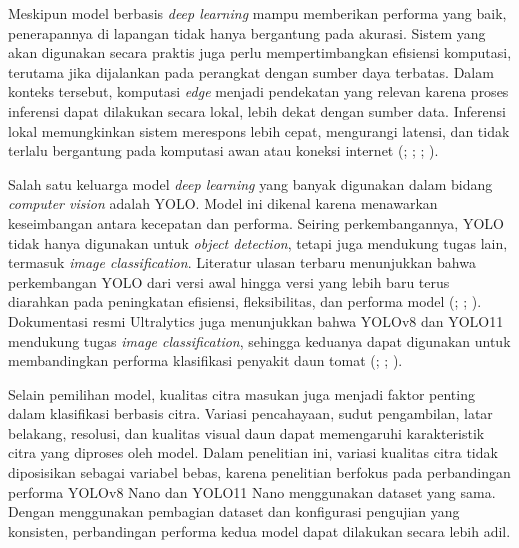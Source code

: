 \begin{sectioncontent}
    Meskipun model berbasis \textit{deep learning} mampu memberikan performa yang baik, penerapannya di lapangan tidak hanya bergantung pada akurasi. Sistem yang akan digunakan secara praktis juga perlu mempertimbangkan efisiensi komputasi, terutama jika dijalankan pada perangkat dengan sumber daya terbatas. Dalam konteks tersebut, komputasi \textit{edge} menjadi pendekatan yang relevan karena proses inferensi dapat dilakukan secara lokal, lebih dekat dengan sumber data. Inferensi lokal memungkinkan sistem merespons lebih cepat, mengurangi latensi, dan tidak terlalu bergantung pada komputasi awan atau koneksi internet (\citealp[hlm. 71--74]{singh2023edge}; \citealp[hlm. 1--4]{gill2025taxonomy}; \citealp[hlm. 1--6]{xu2025edge}; \citealp[hlm. 1, 6--7, dan 10--13]{majeed2024edge}).

    Salah satu keluarga model \textit{deep learning} yang banyak digunakan dalam bidang \textit{computer vision} adalah YOLO. Model ini dikenal karena menawarkan keseimbangan antara kecepatan dan performa. Seiring perkembangannya, YOLO tidak hanya digunakan untuk \textit{object detection}, tetapi juga mendukung tugas lain, termasuk \textit{image classification}. Literatur ulasan terbaru menunjukkan bahwa perkembangan YOLO dari versi awal hingga versi yang lebih baru terus diarahkan pada peningkatan efisiensi, fleksibilitas, dan performa model (\citealp[hlm. 1680--1683]{terven2023yolo}; \citealp[hlm. 1--3]{ali2024yoloframework}; \citealp[hlm. 1--3]{murat2025yolo}). Dokumentasi resmi Ultralytics juga menunjukkan bahwa YOLOv8 dan YOLO11 mendukung tugas \textit{image classification}, sehingga keduanya dapat digunakan untuk membandingkan performa klasifikasi penyakit daun tomat (\citealp[bagian \textit{Image Classification}]{ultralyticsclassify}; \citealp[bagian \textit{YOLOv8 Models}]{ultralyticsyolov8}; \citealp[bagian \textit{YOLO11 Models}]{ultralyticsyolo11}).

    Selain pemilihan model, kualitas citra masukan juga menjadi faktor penting dalam klasifikasi berbasis citra. Variasi pencahayaan, sudut pengambilan, latar belakang, resolusi, dan kualitas visual daun dapat memengaruhi karakteristik citra yang diproses oleh model. Dalam penelitian ini, variasi kualitas citra tidak diposisikan sebagai variabel bebas, karena penelitian berfokus pada perbandingan performa YOLOv8 Nano dan YOLO11 Nano menggunakan dataset yang sama. Dengan menggunakan pembagian dataset dan konfigurasi pengujian yang konsisten, perbandingan performa kedua model dapat dilakukan secara lebih adil.


\end{sectioncontent}
